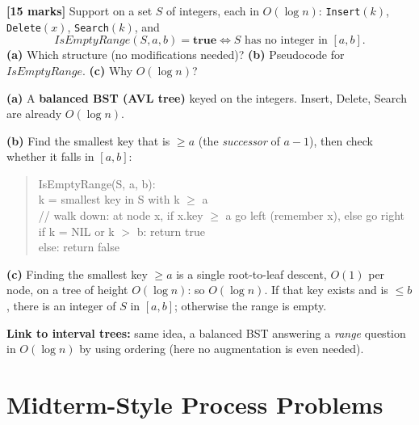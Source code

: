 \documentclass[11pt]{article}
\begin{document}
\begin{exambox}
\textbf{[15 marks]} Support on a set $S$ of integers, each in $O(\log n)$: \texttt{Insert}$(k)$, \texttt{Delete}$(x)$, \texttt{Search}$(k)$, and
\[
  IsEmptyRange(S, a, b) = \textbf{true} \iff S \text{ has no integer in } [a,b].
\]
\textbf{(a)} Which structure (no modifications needed)? \textbf{(b)} Pseudocode for $IsEmptyRange$. \textbf{(c)} Why $O(\log n)$?

\begin{answerband}
\textbf{(a)} A \textbf{balanced BST (AVL tree)} keyed on the integers. Insert, Delete, Search are already $O(\log n)$.

\textbf{(b)} Find the smallest key that is $\ge a$ (the \emph{successor} of $a-1$), then check whether it falls in $[a,b]$:
\begin{quote}\ttfamily
IsEmptyRange(S, a, b):\\
\hspace*{1.5em}k = smallest key in S with k $\ge$ a\\
\hspace*{1.5em}\hspace*{1.5em}// walk down: at node x, if x.key $\ge$ a go left (remember x), else go right\\
\hspace*{1.5em}if k = NIL or k $>$ b: return true\\
\hspace*{1.5em}else: return false
\end{quote}

\textbf{(c)} Finding the smallest key $\ge a$ is a single root-to-leaf descent, $O(1)$ per node, on a tree of height $O(\log n)$: so $O(\log n)$. If that key exists and is $\le b$, there is an integer of $S$ in $[a,b]$; otherwise the range is empty.

\smallskip
\textcolor{violetT}{\textbf{Link to interval trees:}} same idea, a balanced BST answering a \emph{range} question in $O(\log n)$ by using ordering (here no augmentation is even needed).
\end{answerband}
\end{exambox}

\section{Midterm-Style Process Problems}
\end{document}
